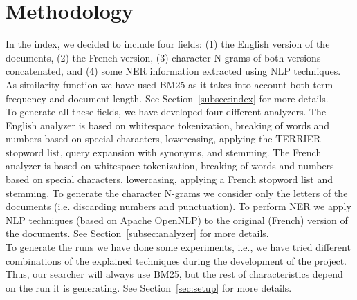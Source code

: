\section{Methodology}\label{sec:methodology}
In the index, we decided to include four fields: (1) the English version of the documents, (2) the French version, (3)
character N-grams of both versions concatenated, and (4) some NER information extracted using NLP techniques.
As similarity function we have used BM25 as it takes into account both term frequency and document length.
See Section~\ref{subsec:index} for more details.\\
To generate all these fields, we have developed four different analyzers. The English analyzer is based on whitespace tokenization, breaking of words and numbers based on special characters, lowercasing, applying the TERRIER stopword list, query expansion with synonyms, and stemming.
The French analyzer is based on whitespace tokenization, breaking of words and numbers based on special characters, lowercasing, applying a French stopword list and stemming. To generate the character N-grams we consider only the letters of the documents (i.e. discarding numbers and punctuation). To perform NER we apply NLP techniques (based on Apache OpenNLP\cite{ApacheOpenNLP}) to the original (French) version of
the documents. See Section~\ref{subsec:analyzer} for more details.\\
To generate the runs we have done some experiments, i.e., we have tried different combinations of the explained techniques during the development of the project. Thus, our searcher will always use BM25, but the rest of characteristics depend on the run it is generating. See Section~\ref{sec:setup} for more details.